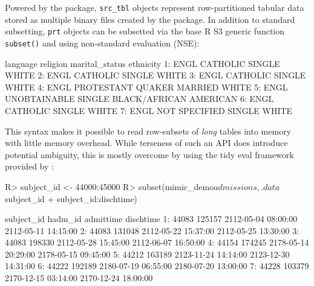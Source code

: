 \documentclass[
  notitle]{jss}
\begin{document}
Powered by the  \citep{bennett2021} package, \texttt{src\_tbl}
objects represent row-partitioned tabular data stored as multiple binary
files created by the  \citep{klik2020} package. In addition to
standard subsetting, \texttt{prt} objects can be subsetted via the base
R S3 generic function \texttt{subset()} and using non-standard
evaluation (NSE):

\begin{CodeChunk}
\begin{CodeOutput}
   language          religion marital_status              ethnicity
1:     ENGL          CATHOLIC         SINGLE                  WHITE
2:     ENGL          CATHOLIC         SINGLE                  WHITE
3:     ENGL          CATHOLIC         SINGLE                  WHITE
4:     ENGL PROTESTANT QUAKER        MARRIED                  WHITE
5:     ENGL      UNOBTAINABLE         SINGLE BLACK/AFRICAN AMERICAN
6:     ENGL          CATHOLIC         SINGLE                  WHITE
7:     ENGL     NOT SPECIFIED         SINGLE                  WHITE
\end{CodeOutput}
\end{CodeChunk}

This syntax makes it possible to read row-subsets of \emph{long} tables
into memory with little memory overhead. While terseness of such an API
does introduce potential ambiguity, this is mostly overcome by using the
tidy eval framework provided by  \citep{wickham2020}:

\begin{CodeChunk}
\begin{CodeInput}
R> subject_id <- 44000:45000
R> subset(mimic_demo$admissions, .data$subject_id %
+        subject_id:dischtime)
\end{CodeInput}
\begin{CodeOutput}
   subject_id hadm_id           admittime           dischtime
1:      44083  125157 2112-05-04 08:00:00 2112-05-11 14:15:00
2:      44083  131048 2112-05-22 15:37:00 2112-05-25 13:30:00
3:      44083  198330 2112-05-28 15:45:00 2112-06-07 16:50:00
4:      44154  174245 2178-05-14 20:29:00 2178-05-15 09:45:00
5:      44212  163189 2123-11-24 14:14:00 2123-12-30 14:31:00
6:      44222  192189 2180-07-19 06:55:00 2180-07-20 13:00:00
7:      44228  103379 2170-12-15 03:14:00 2170-12-24 18:00:00
\end{CodeOutput}
\end{CodeChunk}
\end{document}
